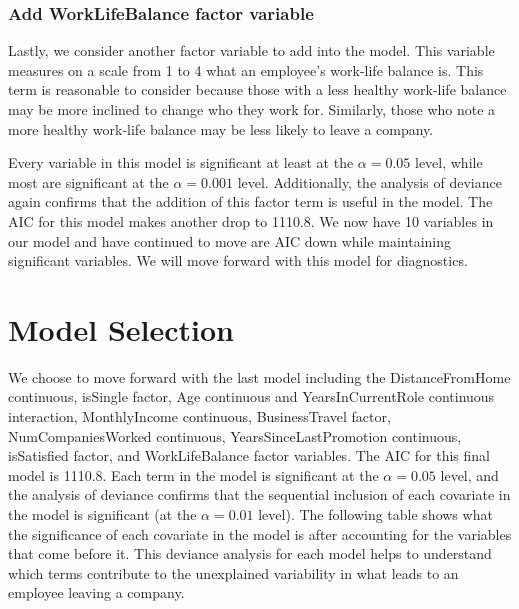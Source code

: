 \documentclass[]{article}
\begin{document}
\hypertarget{add-worklifebalance-factor-variable}{%
\subsubsection{Add WorkLifeBalance factor
variable}\label{add-worklifebalance-factor-variable}}

Lastly, we consider another factor variable to add into the model. This
variable measures on a scale from 1 to 4 what an employee's work-life
balance is. This term is reasonable to consider because those with a
less healthy work-life balance may be more inclined to change who they
work for. Similarly, those who note a more healthy work-life balance may
be less likely to leave a company.

Every variable in this model is significant at least at the
\(\alpha = 0.05\) level, while most are significant at the
\(\alpha = 0.001\) level. Additionally, the analysis of deviance again
confirms that the addition of this factor term is useful in the model.
The AIC for this model makes another drop to 1110.8. We now have 10
variables in our model and have continued to move are AIC down while
maintaining significant variables. We will move forward with this model
for diagnostics.

\hypertarget{model-selection}{%
\section{Model Selection}\label{model-selection}}

We choose to move forward with the last model including the
DistanceFromHome continuous, isSingle factor, Age continuous and
YearsInCurrentRole continuous interaction, MonthlyIncome continuous,
BusinessTravel factor, NumCompaniesWorked continuous,
YearsSinceLastPromotion continuous, isSatisfied factor, and
WorkLifeBalance factor variables. The AIC for this final model is
1110.8. Each term in the model is significant at the \(\alpha = 0.05\)
level, and the analysis of deviance confirms that the sequential
inclusion of each covariate in the model is significant (at the
\(\alpha = 0.01\) level). The following table shows what the
significance of each covariate in the model is after accounting for the
variables that come before it. This deviance analysis for each model
helps to understand which terms contribute to the unexplained
variability in what leads to an employee leaving a company.
\end{document}
